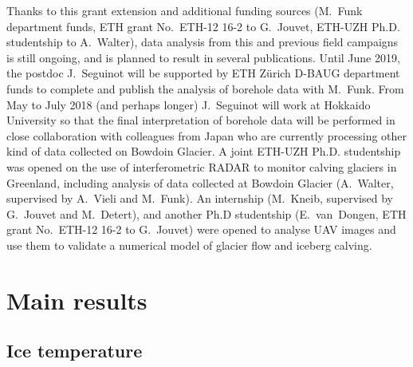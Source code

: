 \documentclass{article}
\begin{document}
    Thanks to this grant extension and additional funding sources (M.~Funk
    department funds, ETH grant No.~ETH-12 16-2 to G.~Jouvet, ETH-UZH Ph.D.
    studentship to A.~Walter), data analysis from this and previous field
    campaigns is still ongoing, and is planned to result in several
    publications. Until June 2019, the postdoc J.~Seguinot will be supported by
    ETH Zürich D-BAUG department funds to complete and publish the analysis of
    borehole data with M.~Funk. From May to July 2018 (and perhaps longer)
    J.~Seguinot will work at Hokkaido University so that the final
    interpretation of borehole data will be performed in close collaboration
    with colleagues from Japan who are currently processing other kind of data
    collected on Bowdoin Glacier. A joint ETH-UZH Ph.D. studentship was opened
    on the use of interferometric RADAR to monitor calving glaciers in
    Greenland, including analysis of data collected at Bowdoin Glacier
    (A.~Walter, supervised by A.~Vieli and M.~Funk). An internship (M.~Kneib,
    supervised by G.~Jouvet and M.~Detert), and another Ph.D studentship
    (E.~van~Dongen, ETH grant No.~ETH-12 16-2 to G.~Jouvet) were opened to
    analyse UAV images and use them to validate a numerical model of glacier
    flow and iceberg calving.


\section{Main results}

\subsection{Ice temperature}
\end{document}
